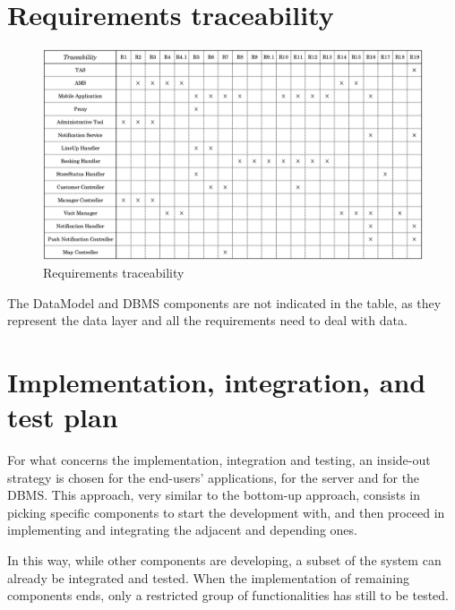 \documentclass[a4paper,oneside,11pt]{book}
\begin{document}
\chapter{Requirements traceability} 
    \begin{figure}[H]
        \centering
        \includegraphics[width=\textwidth, height=\textheight, keepaspectratio]{pictures/traceability}
        \caption{Requirements traceability}
        \label{figure:traceabilityn}
    \end{figure}
    The DataModel and DBMS components are not indicated in the table, as they represent the data layer and all the requirements need to deal with data.

\chapter{Implementation, integration, and test plan}
    For what concerns the implementation, integration and testing, an inside-out strategy is chosen for the end-users' applications, for the server and for the DBMS. This approach, very similar to the bottom-up approach, consists in picking specific components to start the development with, and then proceed in implementing and integrating the adjacent and depending ones. \par
    In this way, while other components are developing, a subset of the system can already be integrated and tested. When the implementation of remaining components ends, only a restricted group of functionalities has still to be tested.
\end{document}
